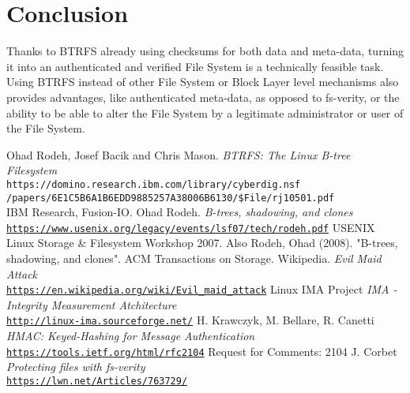 \documentclass[10pt]{article}
\begin{document}
\section{Conclusion}
Thanks to BTRFS already using checksums for both data and meta-data, turning
it into an authenticated and verified File System is a technically feasible
task.  Using BTRFS instead of other File System or Block Layer level
mechanisms also provides advantages, like authenticated meta-data, as opposed
to fs-verity, or the ability to be able to alter the File System by a
legitimate administrator or user of the File System.

\begin{thebibliography}{9}
	Ohad Rodeh, Josef Bacik and Chris Mason.
	\textit{BTRFS: The Linux B-tree Filesystem}
	\\\texttt{https://domino.research.ibm.com/library/cyberdig.nsf\\/papers/6E1C5B6A1B6EDD9885257A38006B6130/\$File/rj10501.pdf}
	\\IBM Research, Fusion-IO.
	Ohad Rodeh.
	\textit{B-trees, shadowing, and clones}
	\\\texttt{\href{https://www.usenix.org/legacy/events/lsf07/tech/rodeh.pdf}{https://www.usenix.org/legacy/events/lsf07/tech/rodeh.pdf}}
	USENIX Linux Storage \& Filesystem Workshop 2007. Also Rodeh, Ohad (2008). "B-trees, shadowing, and clones". ACM Transactions on Storage.
	Wikipedia.
	\textit{Evil Maid Attack}
	\\\texttt{\href{https://en.wikipedia.org/wiki/Evil\_maid\_attack}{https://en.wikipedia.org/wiki/Evil\_maid\_attack}}
	Linux IMA Project
	\textit{IMA - Integrity Measurement Atchitecture}
	\\\texttt{\href{http://linux-ima.sourceforge.net/}{http://linux-ima.sourceforge.net/}}
	H. Krawczyk, M. Bellare, R. Canetti
	\textit{HMAC: Keyed-Hashing for Message Authentication}
	\\\texttt{\href{https://tools.ietf.org/html/rfc2104}{https://tools.ietf.org/html/rfc2104}}
	Request for Comments: 2104 	
	J. Corbet
	\textit{Protecting files with fs-verity}
	\\\texttt{\href{https://lwn.net/Articles/763729/}{https://lwn.net/Articles/763729/}}
\end{thebibliography}
\end{document}

